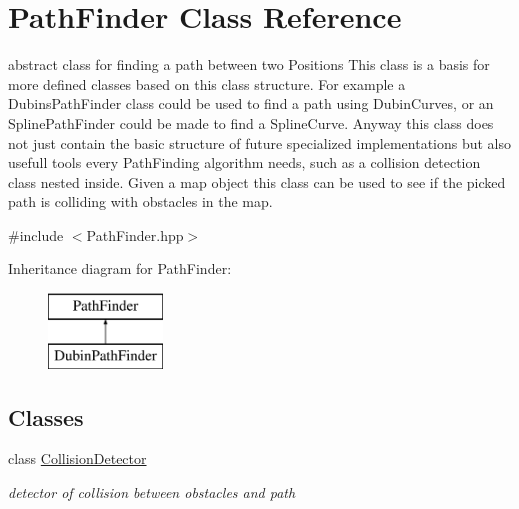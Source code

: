 \hypertarget{class_path_finder}{}\section{Path\+Finder Class Reference}
\label{class_path_finder}


abstract class for finding a path between two Positions  This class is a basis for more defined classes based on this class structure. For example a Dubins\+Path\+Finder class could be used to find a path using Dubin\+Curves, or an Spline\+Path\+Finder could be made to find a Spline\+Curve. Anyway this class does not just contain the basic structure of future specialized implementations but also usefull tools every Path\+Finding algorithm needs, such as a collision detection class nested inside. Given a map object this class can be used to see if the picked path is colliding with obstacles in the map.  




{\ttfamily \#include $<$Path\+Finder.\+hpp$>$}

Inheritance diagram for Path\+Finder\+:\begin{figure}[H]
\begin{center}
\leavevmode
\includegraphics[height=2.000000cm]{class_path_finder}
\end{center}
\end{figure}
\subsection*{Classes}
\begin{DoxyCompactItemize}
\item 
class \mbox{\hyperlink{class_path_finder_1_1_collision_detector}{Collision\+Detector}}
\begin{DoxyCompactList}\small\item\em detector of collision between obstacles and path \end{DoxyCompactList}\end{DoxyCompactItemize}
